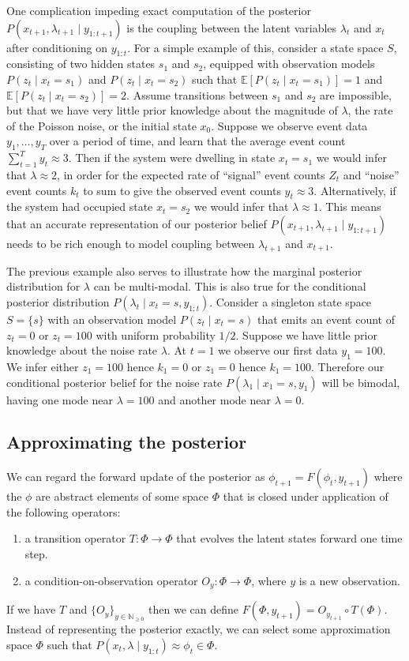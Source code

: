 \documentclass[twoside, 11pt]{article}
\newcommand{\nonnegint}[0] {\mathbb{N}_{\geq 0}}
\newcommand{\E}[0] {\mathbb{E}} %
\begin{document}
One complication impeding exact computation of the posterior $P(x_{t+1}, \lambda_{t+1} \mid y_{1:t+1})$ is the coupling between the latent variables $\lambda_{t}$ and $x_{t}$ after conditioning on $y_{1:t}$. For a simple example of this, consider a state space $S$, consisting of two hidden states $s_1$ and $s_2$, equipped with observation models $P(z_t \mid x_t=s_1)$ and $P(z_t \mid x_t=s_2)$ such that $\E \left[ P(z_t \mid x_t=s_1) \right] = 1$ and $\E \left[ P(z_t \mid x_t=s_2) \right] = 2$. Assume transitions between $s_1$ and $s_2$ are impossible, but that we have very little prior knowledge about the magnitude of $\lambda$, the rate of the Poisson noise, or the initial state $x_0$. Suppose we observe event data $y_1, \ldots, y_T$ over a period of time, and learn that the average event count $\sum_{t=1}^T y_t \approx 3$.  Then if the system were dwelling in state $x_t=s_1$ we would infer that $\lambda \approx 2$, in order for the expected rate of ``signal'' event counts $Z_t$ and ``noise'' event counts $k_t$ to sum to give the observed event counts $y_t \approx 3$. Alternatively, if the system had occupied state $x_t=s_2$ we would infer that $\lambda \approx 1$. This means that an accurate representation of our posterior belief $P(x_{t+1}, \lambda_{t+1} \mid y_{1:t+1})$ needs to be rich enough to model coupling between $\lambda_{t+1}$ and $x_{t+1}$.

The previous example also serves to illustrate how the marginal posterior distribution for $\lambda$ can be multi-modal. This is also true for the conditional posterior distribution $P(\lambda_t \mid x_t=s, y_{1:t})$. Consider a singleton state space $S=\{s\}$ with an observation model $P(z_t \mid x_t=s)$ that emits an event count of $z_t=0$ or $z_t=100$ with uniform probability $1/2$. Suppose we have little prior knowledge about the noise rate $\lambda$. At $t=1$ we observe our first data $y_1=100$. We infer either $z_1=100$ hence $k_1=0$ or $z_1=0$ hence $k_1=100$. Therefore our conditional posterior belief for the noise rate $P(\lambda_1 \mid x_1=s, y_1)$ will be bimodal, having one mode near $\lambda=100$ and another mode near $\lambda=0$.

\subsection{Approximating the posterior}
We can regard the forward update of the posterior as $\phi_{t+1} = F \left( \phi_t, y_{t+1} \right)$ where the $\phi$ are abstract elements of some space $\Phi$ that is closed under application of the following operators:
\begin{enumerate}
\item a transition operator $T : \Phi \rightarrow \Phi$ that evolves the latent states forward one time step.
\item a condition-on-observation operator $O_y : \Phi \rightarrow \Phi$, where $y$ is a new observation.
\end{enumerate}
If we have $T$ and $\{O_y\}_{y \in \nonnegint}$ then we can define $F(\Phi, y_{t+1}) = O_{y_{t+1}} \circ T (\Phi)$. Instead of representing the posterior exactly, we can select some approximation space $\Phi$ such that $P(x_t, \lambda \mid y_{1:t} ) \approx \phi_t \in \Phi$.
\end{document}
